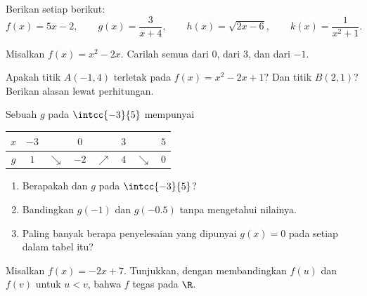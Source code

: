 \begin{exercise}[$\star$]\label{exo:g10:functions:2}
Berikan  setiap  berikut:
\[
f(x) = 5x - 2, \qquad
g(x) = \frac{3}{x + 4}, \qquad
h(x) = \sqrt{2x - 6}, \qquad
k(x) = \frac{1}{x^2 + 1}.
\]
\end{exercise}

\begin{exercise}[$\star$]\label{exo:g10:functions:3}
Misalkan $f(x) = x^2 - 2x$. Carilah semua  dari $0$, dari $3$, dan dari $-1$.
\end{exercise}

\begin{exercise}[$\star$]\label{exo:g10:functions:4}
Apakah titik $A(-1, 4)$ terletak pada  $f(x) = x^2 - 2x + 1$?
Dan titik $B(2, 1)$? Berikan alasan lewat perhitungan.
\end{exercise}

\begin{exercise}[$\star$]\label{exo:g10:functions:5}
Sebuah  $g$ pada $\intcc{-3}{5}$ mempunyai 
\begin{center}
\renewcommand{\arraystretch}{1.3}
\begin{tabular}{c|ccccccc}
$x$ & $-3$ & & $0$ & & $3$ & & $5$ \\
\hline
$g$ & $1$ & $\searrow$ & $-2$ & $\nearrow$ & $4$ & $\searrow$ & $0$ \\
\end{tabular}
\end{center}
\begin{enumerate}
  \item Berapakah  dan  $g$ pada $\intcc{-3}{5}$?
  \item Bandingkan $g(-1)$ dan $g(-0.5)$ tanpa mengetahui nilainya.
  \item Paling banyak berapa penyelesaian yang dipunyai  $g(x) = 0$
        pada setiap  dalam tabel itu?
\end{enumerate}
\end{exercise}

\begin{exercise}[$\star\star$]\label{exo:g10:functions:6}
Misalkan $f(x) = -2x + 7$. Tunjukkan, dengan membandingkan $f(u)$ dan $f(v)$
untuk $u < v$, bahwa $f$ tegas  pada $\R$.
\end{exercise}

